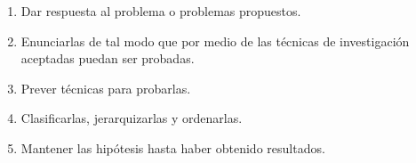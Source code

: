 \begin{enumerate}
 \item Dar respuesta al problema o problemas propuestos.
 \item Enunciarlas de tal modo que por medio de las técnicas de investigación aceptadas puedan ser probadas.
 \item Prever técnicas para probarlas.
 \item Clasificarlas, jerarquizarlas y ordenarlas.
 \item Mantener las hipótesis hasta haber obtenido resultados.
\end{enumerate}